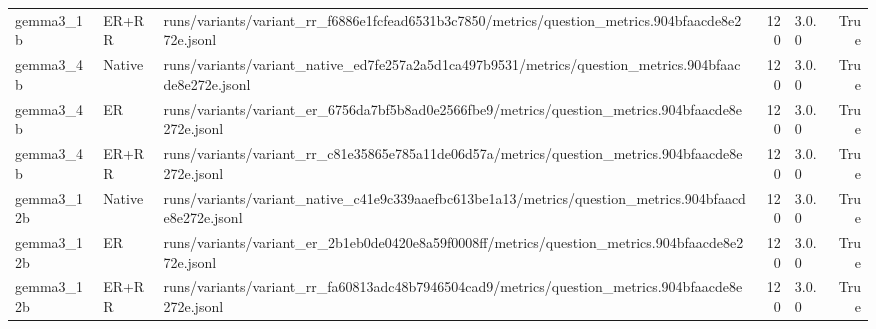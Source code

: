 \begin{tabular}{lllrlr}
gemma3_1b & ER+RR & runs/variants/variant_rr_f6886e1fcfead6531b3c7850/metrics/question_metrics.904bfaacde8e272e.jsonl & 120 & 3.0.0 & True \\
gemma3_4b & Native & runs/variants/variant_native_ed7fe257a2a5d1ca497b9531/metrics/question_metrics.904bfaacde8e272e.jsonl & 120 & 3.0.0 & True \\
gemma3_4b & ER & runs/variants/variant_er_6756da7bf5b8ad0e2566fbe9/metrics/question_metrics.904bfaacde8e272e.jsonl & 120 & 3.0.0 & True \\
gemma3_4b & ER+RR & runs/variants/variant_rr_c81e35865e785a11de06d57a/metrics/question_metrics.904bfaacde8e272e.jsonl & 120 & 3.0.0 & True \\
gemma3_12b & Native & runs/variants/variant_native_c41e9c339aaefbc613be1a13/metrics/question_metrics.904bfaacde8e272e.jsonl & 120 & 3.0.0 & True \\
gemma3_12b & ER & runs/variants/variant_er_2b1eb0de0420e8a59f0008ff/metrics/question_metrics.904bfaacde8e272e.jsonl & 120 & 3.0.0 & True \\
gemma3_12b & ER+RR & runs/variants/variant_rr_fa60813adc48b7946504cad9/metrics/question_metrics.904bfaacde8e272e.jsonl & 120 & 3.0.0 & True \\
\bottomrule
\end{tabular}
